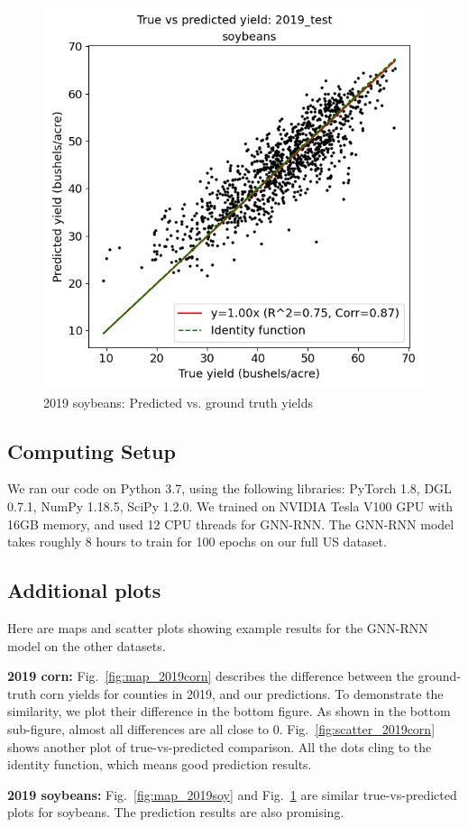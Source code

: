 \begin{figure}[H]
\centering
\includegraphics[width=0.8\columnwidth]{figs/true_vs_predicted_scatter_soybeans_2019_test.png}
\caption{2019 soybeans: Predicted vs. ground truth yields}
\label{fig:scatter_2019soy}
\end{figure}


\subsection{Computing Setup}

We ran our code on Python 3.7, using the following libraries: PyTorch 1.8, DGL 0.7.1, NumPy 1.18.5, SciPy 1.2.0. We trained on NVIDIA Tesla V100 GPU with 16GB memory, and used 12 CPU threads for GNN-RNN. The GNN-RNN model takes roughly 8 hours to train for 100 epochs on our full US dataset.



\subsection{Additional plots}

Here are maps and scatter plots showing example results for the GNN-RNN model on the other datasets.


\textbf{2019 corn:} Fig.~\ref{fig:map_2019corn} describes the difference between the ground-truth corn yields for counties in 2019, and our predictions. To demonstrate the similarity, we plot their difference in the bottom figure. As shown in the bottom sub-figure, almost all differences are all close to 0. Fig.~\ref{fig:scatter_2019corn} shows another plot of true-vs-predicted comparison. All the dots cling to the identity function, which means good prediction results.


\textbf{2019 soybeans:} Fig.~\ref{fig:map_2019soy} and Fig.~\ref{fig:scatter_2019soy} are similar true-vs-predicted plots for soybeans. The prediction results are also promising.





